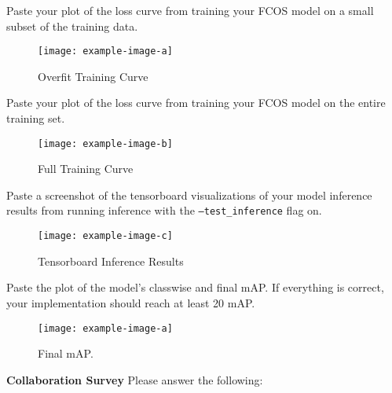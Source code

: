 \documentclass[11pt,addpoints,answers]{exam}
\numberwithin{equation}{section} %
\numberwithin{figure}{section} %
\numberwithin{table}{section} %
\begin{document}
\begin{questions}
\question Paste your plot of the loss curve from training your FCOS model on a small subset of the training data.

\begin{figure}[H]
    \centering
    \texttt{[image: example-image-a]}
    \caption{Overfit Training Curve}
    \label{fig:overfit_plot}
\end{figure}
\question Paste your plot of the loss curve from training your FCOS model on the entire training set.

\begin{figure}[H]
    \centering
    \texttt{[image: example-image-b]}
    \caption{Full Training Curve}
    \label{fig:full_loss_plot}
\end{figure}

\question Paste a screenshot of the tensorboard visualizations of your model inference results from running inference with the \texttt{--test\_inference} flag on.

\begin{figure}[H]
    \centering
    \texttt{[image: example-image-c]}
    \caption{Tensorboard Inference Results}
    \label{fig:inference_results}
\end{figure}

\question Paste the plot of the model's classwise and final mAP. If everything is correct, your implementation should reach at least 20 mAP.

\begin{figure}[H]
    \centering
    \texttt{[image: example-image-a]}
    \caption{Final mAP.}
    \label{fig:final_mAP}
\end{figure}
\end{questions}



\clearpage

\textbf{Collaboration Survey} Please answer the following:
\end{document}
